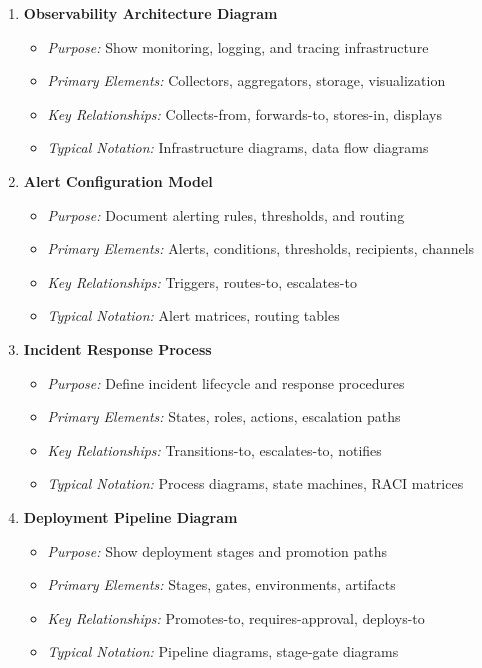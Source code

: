 \documentclass[11pt,letterpaper]{article}
\begin{document}
\begin{enumerate}[label=\textbf{MT\arabic*:}, leftmargin=2.5em]
    \item \textbf{Observability Architecture Diagram}
    \begin{itemize}[nosep]
        \item \textit{Purpose:} Show monitoring, logging, and tracing infrastructure
        \item \textit{Primary Elements:} Collectors, aggregators, storage, visualization
        \item \textit{Key Relationships:} Collects-from, forwards-to, stores-in, displays
        \item \textit{Typical Notation:} Infrastructure diagrams, data flow diagrams
    \end{itemize}
    
    \item \textbf{Alert Configuration Model}
    \begin{itemize}[nosep]
        \item \textit{Purpose:} Document alerting rules, thresholds, and routing
        \item \textit{Primary Elements:} Alerts, conditions, thresholds, recipients, channels
        \item \textit{Key Relationships:} Triggers, routes-to, escalates-to
        \item \textit{Typical Notation:} Alert matrices, routing tables
    \end{itemize}
    
    \item \textbf{Incident Response Process}
    \begin{itemize}[nosep]
        \item \textit{Purpose:} Define incident lifecycle and response procedures
        \item \textit{Primary Elements:} States, roles, actions, escalation paths
        \item \textit{Key Relationships:} Transitions-to, escalates-to, notifies
        \item \textit{Typical Notation:} Process diagrams, state machines, RACI matrices
    \end{itemize}
    
    \item \textbf{Deployment Pipeline Diagram}
    \begin{itemize}[nosep]
        \item \textit{Purpose:} Show deployment stages and promotion paths
        \item \textit{Primary Elements:} Stages, gates, environments, artifacts
        \item \textit{Key Relationships:} Promotes-to, requires-approval, deploys-to
        \item \textit{Typical Notation:} Pipeline diagrams, stage-gate diagrams
    \end{itemize}
    

\end{enumerate}
\end{document}
